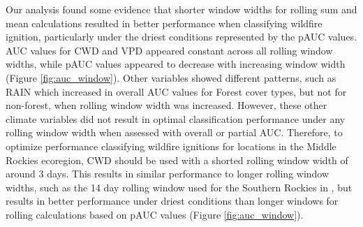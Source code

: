 \documentclass[11p]{article}
\begin{document}
Our analysis found some evidence that shorter window widths for rolling sum and mean calculations resulted in better performance when classifying wildfire ignition, particularly under the driest conditions represented by the pAUC values. AUC values for CWD and VPD appeared constant across all rolling window widths, while pAUC values appeared to decrease with increasing window width (Figure \ref{fig:auc_window}). Other variables showed different patterns, such as RAIN which increased in overall AUC values for Forest cover types, but not for non-forest, when rolling window width was increased. However, these other climate variables did not result in optimal classification performance under any rolling window width when assessed with overall or partial AUC. Therefore, to optimize performance classifying wildfire ignitions for locations in the Middle Rockies ecoregion, CWD should be used with a shorted rolling window width of around 3 days. This results in similar performance to longer rolling window widths, such as the 14 day rolling window used for the Southern Rockies in  \citet{thomaWaterBalanceIndicator2020}, but results in better performance under driest conditions than longer windows for rolling calculations based on pAUC values (Figure \ref{fig:auc_window}). 
\end{document}
